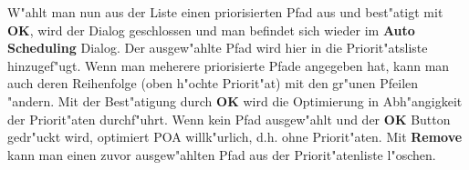 \documentclass[a4paper,titlepage,12pt,ngerman]{scrbook}
\begin{document}
W"ahlt man nun aus der Liste einen priorisierten Pfad aus und best"atigt mit {\bf OK}, wird der Dialog geschlossen und man befindet sich wieder im {\bf Auto Scheduling} Dialog. Der ausgew"ahlte Pfad wird hier in die Priorit"atsliste hinzugef"ugt. Wenn man meherere priorisierte Pfade angegeben hat, kann man auch deren Reihenfolge (oben h"ochte Priorit"at) mit den gr"unen Pfeilen "andern. Mit der Best"atigung durch {\bf OK} wird die Optimierung in Abh"angigkeit der Priorit"aten durchf"uhrt.\newline
Wenn kein Pfad ausgew"ahlt und der {\bf OK} Button gedr"uckt wird, optimiert POA willk"urlich, d.h. ohne Priorit"aten.\newline
Mit {\bf Remove} kann man einen zuvor ausgew"ahlten Pfad aus der Priorit"atenliste l"oschen.

\newpage
\end{document}
